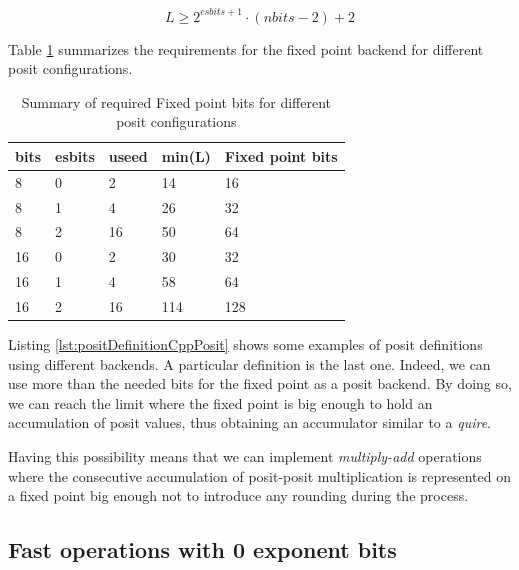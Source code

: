 \begin{equation}
    L \geq 2^{esbits + 1} \cdot (nbits - 2) + 2
\end{equation}

Table \ref{tab:fixedPointToPositSize} summarizes the requirements for the fixed point backend for different posit configurations.

\begin{table}[]
\centering
\caption{Summary of required Fixed point bits for different posit configurations}
\label{tab:fixedPointToPositSize}
\begin{tabular}{lllll}

bits & esbits & useed & min(L) & Fixed point bits \\ \hline
8    & 0      & 2     & 14     & 16               \\
8    & 1      & 4     & 26     & 32               \\
8    & 2      & 16    & 50     & 64               \\
16   & 0      & 2     & 30     & 32               \\
16   & 1      & 4     & 58     & 64               \\
16   & 2      & 16    & 114    & 128              \\ \hline
\end{tabular}
\end{table}

Listing \ref{lst:positDefinitionCppPosit} shows some examples of posit definitions using different backends. A particular definition is the last one. Indeed, we can use more than the needed bits for the fixed point as a posit backend. By doing so, we can reach the limit where the fixed point is big enough to hold an accumulation of posit values, thus obtaining an accumulator similar to a \textit{quire}.

Having this possibility means that we can implement \textit{multiply-add} operations where the consecutive accumulation of posit-posit multiplication is represented on a fixed point big enough not to introduce any rounding during the process.  





\subsection{Fast operations with 0 exponent bits}

